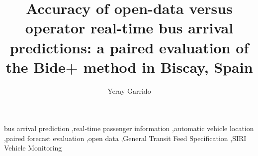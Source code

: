 \documentclass[preprint,11pt,nonatbib]{elsarticle}
\begin{document}
\begin{frontmatter}

\title{Accuracy of open-data versus operator real-time bus arrival predictions: a paired evaluation of the Bide+ method
in Biscay, Spain}

\author[1]{Yeray Garrido}

% 

\begin{abstract}

\end{abstract}

\begin{keyword}
bus arrival prediction \sep real-time passenger information \sep automatic vehicle location \sep paired forecast
evaluation \sep open data \sep General Transit Feed Specification \sep SIRI Vehicle Monitoring
\end{keyword}

\end{frontmatter}









\clearpage
\printbibliography
\end{document}
